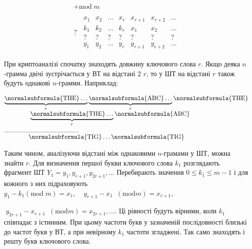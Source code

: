 \bigskip

\begin{equation*}
{\begin{matrix}+\text{mod}\;m\\\\?\;\;\begin{matrix}x_{{1}}&x_{{2}}&\dots&x_{{r}}&x_{{r+1}}&x_{{r+2}}&\dots\\k_{{1}}&k_{{2}}&\text{.}\text{.}\text{.}&k_{{r}}&x_{{1}}&x_{{2}}&\text{.}\text{.}\text{.}\\?&?&?&?&?&?&?\\y_{{1}}&y_{{2}}&\text{.}\text{.}\text{.}&y_{{r}}&y_{{r+1}}&y_{{r+2}}&\text{.}\text{.}\text{.}\end{matrix}\end{matrix}}
\end{equation*}

\bigskip

При криптоаналізі спочатку знаходять довжину ключового слова  ${r}$. Якщо деяка 
${n}${}-грамма двічі зустрічається у ВТ на відстані 2 ${r}$, то у ШТ на
відстані  ${r}$ також будуть однакові  ${n}${}-грамми. Наприклад:


\bigskip

\begin{equation*}
\begin{matrix}{\underbrace{\normalsubformula{\text{THE}}\dots}_{{r}}\underbrace{\normalsubformula{\text{ABC}}\dots}_{{r}}\normalsubformula{\text{THE}}}\hfill\null
\\\;\;\;\;\;\;\;\;\;\;\;\;\;\;\;\underbrace{\normalsubformula{\text{THE}}\dots}_{{r}}\normalsubformula{\text{ABC}}\hfill\null
\\\text{\_\_\_\_\_\_\_\_\_\_\_\_\_\_\_\_}\hfill\null
\\\;\;\;\;\;\;\;\;\;\;\;\;\;\;\normalsubformula{\text{TIG}}\dots\normalsubformula{\text{TIG}}\hfill\null
\end{matrix}\hfill 
\end{equation*}

\bigskip

Таким чином, аналізуючи відстані між однаковими  ${n}${}-грамами у ШТ, можна
знайти  ${r}$. Для визначення першої букви ключового слова  ${k_{{1}}}$
розглядають фрагмент ШТ 
${Y_{{1}}=y_{{1}},y_{{r+1}},y_{{2r+1}},\dots}$ Перебирають
значення  ${0\le k_{{1}}\le m-1}$ і для кожного з них підраховують 
${y_{{1}}-k_{{1}}(\text{mod}\;m)=x_{{1}},\;\;\;\;y_{{r+1}}-x_{{1}}\;\;(\text{mod}m)=x_{{r+1}},\;\;\;\;\;}$


${\;y_{{2r+1}}-x_{{r+1}}\;\;(\text{mod}m)=x_{{2r+1}},\dots}$.
Ці рівності будуть вірними, коли  ${k_{{1}}}$ співпадає з істинним. При цьому
частоти букв у зазначеній послідовності близькі до частот букв у ВТ, а при
невірному  ${k_{{1}}}$ частоти згладжені. Так само знаходять і решту букв
ключового слова.

